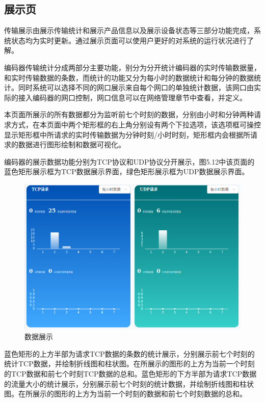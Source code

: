\subsection{展示页}

传输展示由展示传输统计和展示产品信息以及展示设备状态等三部分功能完成，系统状态均为实时更新。通过展示页面可以使用户更好的对系统的运行状况进行了解。

编码器传输统计分成两部分主要功能，别分为分开统计编码器的实时传输数据量，和实时传输数据的条数，而统计的功能又分为每小时的数据统计和每分钟的数据统计。同时系统可以选择不同的网口展示来自每个网口的单独统计数据，该网口由实际的接入编码器的网口控制，网口信息可以在网络管理章节中查看，并定义。

本页面所展示的所有数据都分为监听前七个时刻的数据，分别由小时和分钟两种请求方式，在本页面中两个矩形框的右上角分别设有两个下拉选项，该选项框可操控显示矩形框中所请求的实时传输数据为分钟时刻/小时时刻，矩形框内会根据所请求的数据进行图形绘制和数据可视化。

编码器的展示数据功能分别为TCP协议和UDP协议分开展示，图5.12中该页面的蓝色矩形展示框为TCP数据展示界面，绿色矩形展示框为UDP数据展示界面。

\begin{figure}[!htbp]
\centering
\includegraphics[scale=1]{figures/HW/N5.png}
\caption{数据展示}
\end{figure}

蓝色矩形的上方半部为请求TCP数据的条数的统计展示，分别展示前七个时刻的统计TCP数据，并绘制折线图和柱状图。在所展示的图形的上方为当前一个时刻的TCP数据和前七个时刻TCP数据的总和。蓝色矩形的下方半部为请求TCP数据的流量大小的统计展示，分别展示前七个时刻的统计数据，并绘制折线图和柱状图。在所展示的图形的上方为当前一个时刻的数据和前七个时刻数据的总和。

